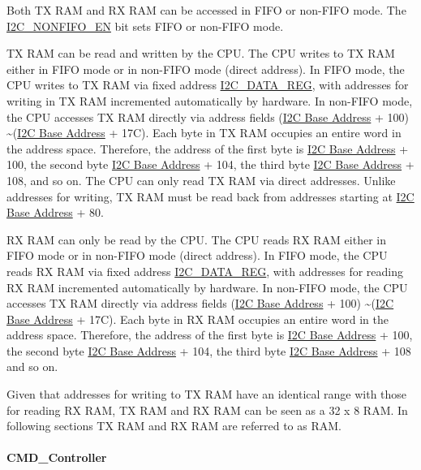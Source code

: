 \documentclass[main\_\_EN.tex]{subfiles}
\begin{document}
Both TX RAM and RX RAM can be accessed in FIFO or non-FIFO mode. The \hyperref[fielddesc:I2CNONFIFOEN]{I2C\_NONFIFO\_EN} bit sets FIFO or non-FIFO mode.

TX RAM can be read and written by the CPU. The CPU writes to TX RAM either in FIFO mode or in non-FIFO mode (direct address). In FIFO mode, the CPU writes to TX RAM via fixed address \hyperref[regdesc:I2CDATAREG]{I2C\_DATA\_REG}, with addresses for writing in TX RAM incremented automatically by hardware. In non-FIFO mode, the CPU accesses TX RAM directly via address fields (\hyperref[table:I2C base address]{I2C Base Address} + \hexprefix{}100) \textasciitilde (\hyperref[table:I2C base address]{I2C Base Address} + \hexprefix{}17C). Each byte in TX RAM occupies an entire word in the address space. Therefore, the address of the first byte is \hyperref[table:I2C base address]{I2C Base Address} + \hexprefix{}100, the second byte \hyperref[table:I2C base address]{I2C Base Address} + \hexprefix{}104, the third byte \hyperref[table:I2C base address]{I2C Base Address} + \hexprefix{}108, and so on. The CPU can only read TX RAM via direct addresses. Unlike addresses for writing, TX RAM must be read back from addresses starting at \hyperref[table:I2C base address]{I2C Base Address} + \hexprefix{}80.

RX RAM can only be read by the CPU. The CPU reads RX RAM either in FIFO mode or in non-FIFO mode (direct address). In FIFO mode, the CPU reads RX RAM via fixed address \hyperref[regdesc:I2CDATAREG]{I2C\_DATA\_REG}, with addresses for reading RX RAM incremented automatically by hardware. In non-FIFO mode, the CPU accesses TX RAM directly via address fields (\hyperref[table:I2C base address]{I2C Base Address} + \hexprefix{}100) \textasciitilde (\hyperref[table:I2C base address]{I2C Base Address} + \hexprefix{}17C). Each byte in RX RAM occupies an entire word in the address space. Therefore, the address of the first byte is \hyperref[table:I2C base address]{I2C Base Address} + \hexprefix{}100, the second byte \hyperref[table:I2C base address]{I2C Base Address} + \hexprefix{}104, the third byte \hyperref[table:I2C base address]{I2C Base Address} + \hexprefix{}108 and so on.

Given that addresses for writing to TX RAM have an identical range with those for reading RX RAM, TX RAM and RX RAM can be seen as a 32 x 8 RAM. In following sections TX RAM and RX RAM are referred to as RAM.

\paragraph {CMD\_Controller}\label{i2c_cmd_controller}
\end{document}
